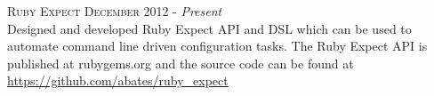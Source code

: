 
\textsc{Ruby Expect} \hfill \textsc{December 2012} - \emph{Present} \\
Designed and developed Ruby Expect API and DSL which can be used to automate
command line driven configuration tasks.  The Ruby Expect API is published at
rubygems.org and the source code can be found at
\href{https://github.com/abates/ruby\_expect}{https://github.com/abates/ruby\_expect}

